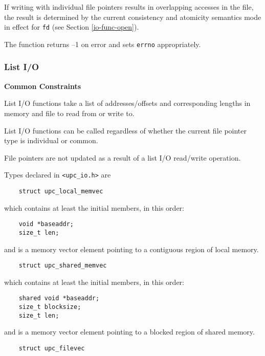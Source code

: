 \np If writing with individual file pointers results in overlapping accesses in
the file, the result is determined by the current consistency and atomicity
semantics mode in effect for {\tt fd} (see Section \ref{io-func-open}).

\np The function returns --1 on error and sets {\tt errno} appropriately.

\subsubsection{List I/O}
\label{io-func-list}

{\bf Common Constraints}

\npf List I/O functions take a list of addresses/offsets and corresponding
lengths in memory and file to read from or write to.

\np List I/O functions can be called regardless of whether the current file pointer
type is individual or common.

\np File pointers are not updated as a result of a list I/O read/write
operation.

\np Types declared in \verb=<upc_io.h>= are

\begin{verbatim}
    struct upc_local_memvec
\end{verbatim}

which contains at least the initial members, in this order:

\begin{verbatim}
    void *baseaddr;
    size_t len;
\end{verbatim}

and is a memory vector element pointing to a contiguous region of
local memory.

\np\vspace{-2.5em}
\begin{verbatim}
    struct upc_shared_memvec
\end{verbatim}

which  contains at least the initial members, in this order:

\begin{verbatim}
    shared void *baseaddr;
    size_t blocksize;
    size_t len;
\end{verbatim}

and is a memory vector element pointing to a blocked region of
shared memory.

\np\vspace{-2.5em}
\begin{verbatim}
    struct upc_filevec
\end{verbatim}


